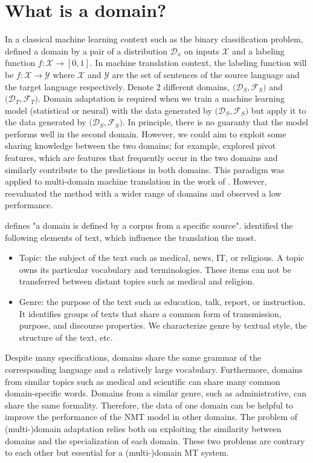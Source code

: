 \section{What is a domain?}
\label{sec:domain}
In a classical machine learning context such as the binary classification problem, \citet{Shai10A} defined a domain by a pair of a distribution $\mathcal{D}_x$ on inputs $\mathcal{X}$ and a labeling function $f: \mathcal{X} \rightarrow [0,1]$. In machine translation context, the labeling function will be $f: \mathcal{X} \rightarrow \mathcal{Y}$ where $\mathcal{X}$ and $\mathcal{Y}$ are the set of sentences of the source language and the target language respectively. Denote 2 different domains, $\big( \mathcal{D}_S, \mathcal{F}_S \big)$ and $\big( \mathcal{D}_T, \mathcal{F}_T \big)$. Domain adaptation is required when we train a machine learning model (statistical or neural) with the data generated by $\big(\mathcal{D}_S, \mathcal{F}_S \big)$ but apply it to the data generated by $\big(\mathcal{D}_S, \mathcal{F}_S \big)$. In principle, there is no guaranty that the model performs well in the second domain. However, we could aim to exploit some sharing knowledge between the two domains; for example, \citet{Blitzer06Domain} explored pivot features, which are features that frequently occur in the two domains and similarly contribute to the predictions in both domains. This paradigm was applied to multi-domain machine translation in the work of \citet{Britz17effective}. However, \cite{Pham21revisiting} reevaluated the method with a wider range of domains and observed a low performance.

\citet{koehn17six} defines "a domain is defined by a corpus from a specific source". \citet{Wees15Whats,Wees17Whats} identified the following elements of text, which influence the translation the most.
\begin{itemize}
	\item Topic: the subject of the text such as medical, news, IT, or religious. A topic owns its particular vocabulary and terminologies. These items can not be transferred between distant topics such as medical and religion.
	\item Genre: the purpose of the text such as education, talk, report, or instruction. It identifies groups of texts that share a common form of transmission, purpose, and discourse properties. We characterize genre by textual style, the structure of the text, etc.
\end{itemize}

Despite many specifications, domains share the same grammar of the corresponding language and a relatively large vocabulary. Furthermore, domains from similar topics such as medical and scientific can share many common domain-specific words. Domains from a similar genre, such as administrative, can share the same formality. Therefore, the data of one domain can be helpful to improve the performance of the NMT model in other domains. The problem of (multi-)domain adaptation relies both on exploiting the similarity between domains and the specialization of each domain. These two problems are contrary to each other but essential for a (multi-)domain MT system.

